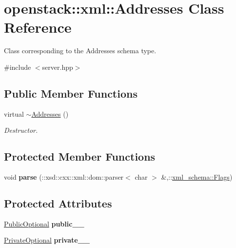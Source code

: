 \hypertarget{classopenstack_1_1xml_1_1Addresses}{
\section{openstack::xml::Addresses Class Reference}
\label{classopenstack_1_1xml_1_1Addresses}
}


Class corresponding to the Addresses schema type.  




{\ttfamily \#include $<$server.hpp$>$}

\subsection*{Public Member Functions}
\begin{DoxyCompactItemize}
\item 
\hypertarget{classopenstack_1_1xml_1_1Addresses_a7e0f5806ffa045d92863d7bf6c1a846a}{
virtual \hyperlink{classopenstack_1_1xml_1_1Addresses_a7e0f5806ffa045d92863d7bf6c1a846a}{$\sim$Addresses} ()}
\label{classopenstack_1_1xml_1_1Addresses_a7e0f5806ffa045d92863d7bf6c1a846a}

\begin{DoxyCompactList}\small\item\em Destructor. \item\end{DoxyCompactList}\end{DoxyCompactItemize}
\subsection*{Protected Member Functions}
\begin{DoxyCompactItemize}
\item 
\hypertarget{classopenstack_1_1xml_1_1Addresses_ab793f6a4bac5202b98aa1a8b5861aa47}{
void {\bfseries parse} (::xsd::cxx::xml::dom::parser$<$ char $>$ \&,::\hyperlink{namespacexml__schema_affb4c227cbd9aa7453dd1dc5a1401943}{xml\_\-schema::Flags})}
\label{classopenstack_1_1xml_1_1Addresses_ab793f6a4bac5202b98aa1a8b5861aa47}

\end{DoxyCompactItemize}
\subsection*{Protected Attributes}
\begin{DoxyCompactItemize}
\item 
\hypertarget{classopenstack_1_1xml_1_1Addresses_a1258ce520962deed6c9f4a17550ad055}{
\hyperlink{classopenstack_1_1xml_1_1Addresses_a92f6f7282346412c4c85b46340dba3a6}{PublicOptional} {\bfseries public\_\-\_\-}}
\label{classopenstack_1_1xml_1_1Addresses_a1258ce520962deed6c9f4a17550ad055}

\item 
\hypertarget{classopenstack_1_1xml_1_1Addresses_a07478dc9cfa9c62c112d1e70b99073a7}{
\hyperlink{classopenstack_1_1xml_1_1Addresses_a63822dad44c10c954bc42c5af4d7aaaf}{PrivateOptional} {\bfseries private\_\-\_\-}}
\label{classopenstack_1_1xml_1_1Addresses_a07478dc9cfa9c62c112d1e70b99073a7}

\end{DoxyCompactItemize}
